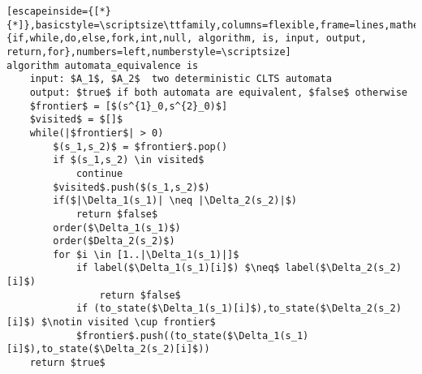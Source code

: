 \renewcommand{\ttdefault}{pcr}
\begin{lstlisting}[escapeinside={[*}{*]},basicstyle=\scriptsize\ttfamily,columns=flexible,frame=lines,mathescape=true,xleftmargin=3.0ex,keywordstyle=\textbf,morekeywords={if,while,do,else,fork,int,null, algorithm, is, input, output, return,for},numbers=left,numberstyle=\scriptsize]
algorithm automata_equivalence is
	input: $A_1$, $A_2$  two deterministic CLTS automata
	output: $true$ if both automata are equivalent, $false$ otherwise
	$frontier$ = [$(s^{1}_0,s^{2}_0)$]
	$visited$ = $[]$
	while(|$frontier$| > 0)
		$(s_1,s_2)$ = $frontier$.pop()
		if $(s_1,s_2) \in visited$
			continue
		$visited$.push($(s_1,s_2)$)
		if($|\Delta_1(s_1)| \neq |\Delta_2(s_2)|$)
			return $false$
		order($\Delta_1(s_1)$)
		order($Delta_2(s_2)$)
		for $i \in [1..|\Delta_1(s_1)|]$
			if label($\Delta_1(s_1)[i]$) $\neq$ label($\Delta_2(s_2)[i]$)
				return $false$
			if (to_state($\Delta_1(s_1)[i]$),to_state($\Delta_2(s_2)[i]$) $\notin visited \cup frontier$
			$frontier$.push((to_state($\Delta_1(s_1)[i]$),to_state($\Delta_2(s_2)[i]$))
	return $true$

\end{lstlisting}